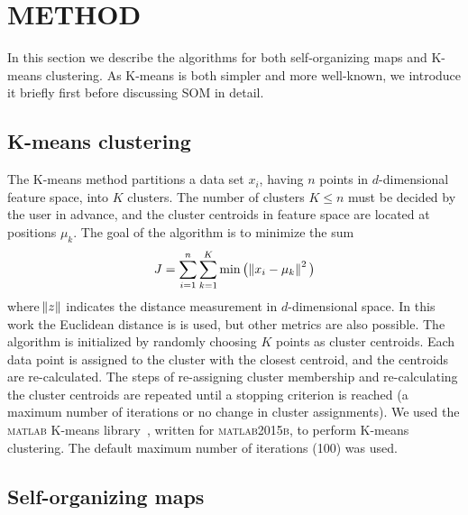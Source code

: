 \section{METHOD}
\label{sec: method_somz}

In this section we describe the algorithms for both self-organizing maps and K-means clustering. As K-means is both simpler and more well-known, we introduce it briefly first before discussing SOM in detail. 


\subsection{K-means clustering}
\label{sec: kmeans_method}


The K-means method partitions a data set $x_i$, having $n$ points in $d$-dimensional feature space, into $K$ clusters.
The number of clusters $K\leq n$ must be decided by the user in advance, and the cluster centroids in feature space are located at positions $\mu_k$.
The goal of the algorithm is to minimize the sum
\begin{equation}
\label{eq:km_sos}
J = \sum_{i=1}^n \sum_{k=1}^K \min \big( \norm{x_i - \mu_k}^2 \big)
\end{equation}
where $\norm{z}$ indicates the distance measurement in $d$-dimensional space. In this work the Euclidean distance is is used, but other metrics are also possible.
The algorithm is initialized by randomly choosing $K$ points as cluster centroids.
Each data point is assigned to the cluster with the closest centroid, and the centroids are re-calculated.
The steps of re-assigning cluster membership and re-calculating the cluster centroids are repeated until a stopping criterion is reached (a maximum number of iterations or no change in cluster assignments).
We used the \textsc{matlab} K-means library~\citep{Seber84, Spath85}, written for \textsc{matlab2015b}, to perform  K-means clustering.
The default maximum number of iterations (100) was used.



 \subsection{Self-organizing maps}
 \label{sec: som}
 
